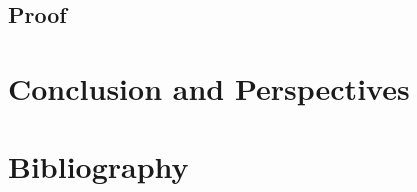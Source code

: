\documentclass{beamer}
\begin{document}
\subsection{Proof}


\begin{frame}\frametitle{}
\end{frame}


\section{Conclusion and Perspectives}






\section{Bibliography}
\begin{frame}




\end{frame}
\end{document}
